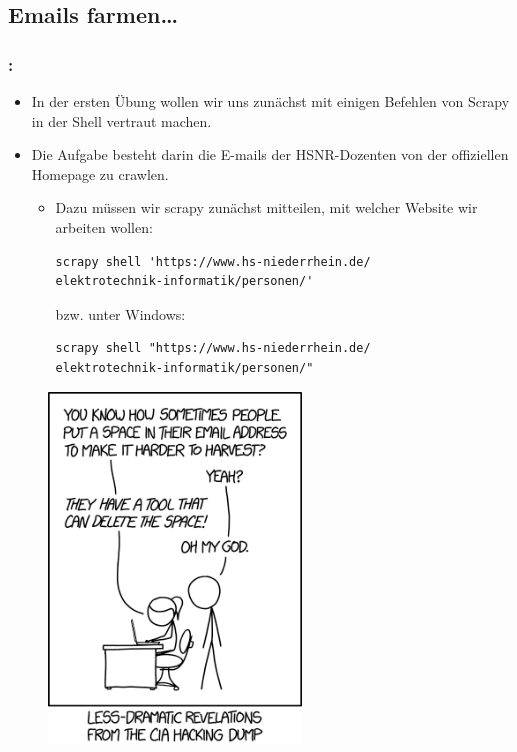 \documentclass{beamer}
\begin{document}
\subsection{Emails farmen\ldots}
\begin{frame}[fragile]
	\frametitle{\insertsection{}: \insertsubsection{}}
	\begin{itemize}
		\item In der ersten Übung wollen wir uns zunächst mit einigen Befehlen von
		Scrapy in der Shell vertraut machen.
		\item Die Aufgabe besteht darin die E-mails der HSNR-Dozenten von der
		offiziellen Homepage zu crawlen.
		\begin{itemize}
			\item Dazu müssen wir scrapy zunächst mitteilen, mit welcher Website wir
			arbeiten wollen: 

			\begin{lstlisting}  
scrapy shell 'https://www.hs-niederrhein.de/
elektrotechnik-informatik/personen/'
			\end{lstlisting}
			
			bzw. unter Windows:
			
			\begin{lstlisting}  
scrapy shell "https://www.hs-niederrhein.de/
elektrotechnik-informatik/personen/"
			\end{lstlisting}
						

		\end{itemize}
	\end{itemize}
\end{frame}

\framebreak

\begin{figure}
	\begin{center}
		\includegraphics[width=0.6\textwidth]{texsrc/hacking_xkcd}
	\end{center}
	\label{fig:XKCD_HACKING}
\end{figure}
\end{document}

